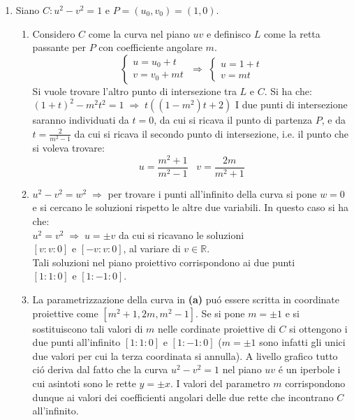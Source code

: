 \documentclass[a4paper]{article}
\newcommand{\R}{\mathbb{R}}
\newcommand{\sist}{\begin{cases}}
\newcommand{\esist}{\end{cases}}
\newcommand{\ds}{\displaystyle}
\begin{document}
\begin{enumerate}
\item Siano $C:u^2-v^2=1$ e $P=(u_0,v_0)=(1,0)$.\\
\begin{enumerate}
\item Considero $C$ come la curva nel piano $uv$ e definisco $L$ come la retta passante per $P$ con coefficiente angolare $m$.\\
$$\sist
u=u_0+t \\
v=v_0+mt 
\esist \;\Rightarrow\;
\sist
u=1+t \\
v=mt 
\esist$$
Si vuole trovare l'altro punto di intersezione tra $L$ e $C$. Si ha che:\\
$(1+t)^2-m^2t^2=1\;\Rightarrow\;t((1-m^2)t+2)$
I due punti di intersezione saranno individuati da $t=0$, da cui si ricava il punto di partenza $P$, e da 
$t=\ds{\frac{2}{m^2-1}}$ da cui si ricava il secondo punto di intersezione, i.e. il punto che si voleva trovare:
$$\ds{u=\frac{m^2+1}{m^2-1}\;\;\;v=\frac{2m}{m^2+1}}$$ 
\item $u^2-v^2=w^2\;\Rightarrow$ per trovare i punti all'infinito della curva si pone $w=0$ e si cercano le soluzioni rispetto le altre due variabili. In questo caso si ha che:\\
$u^2=v^2\;\Rightarrow\;u=\pm v$ da cui si ricavano le soluzioni\\
$[v:v:0]$ e $[-v:v:0]$, al variare di $v\in\R$.\\
Tali soluzioni nel piano proiettivo corrispondono ai due punti\\
$[1:1:0]$ e $[1:-1:0]$.

\item La parametrizzazione della curva in \textbf{(a)} pu\'o essere scritta in coordinate proiettive come 
$[m^2+1,2m,m^2-1]$. Se si pone $m=\pm 1$ e si sostituiscono tali valori di $m$ nelle cordinate proiettive di $C$ si ottengono i due punti all'infinito $[1:1:0]$ e $[1:-1:0]$ ($m=\pm 1$ sono infatti gli unici due valori per cui la terza coordinata si annulla). A livello grafico tutto ci\'o deriva dal fatto che la curva $u^2-v^2=1$ nel piano $uv$ \'e un iperbole i cui asintoti sono le rette $y=\pm x$. I valori del parametro $m$ corrispondono dunque ai valori dei coefficienti angolari delle due rette che incontrano $C$ all'infinito.
\end{enumerate}





\end{enumerate}
\end{document}

